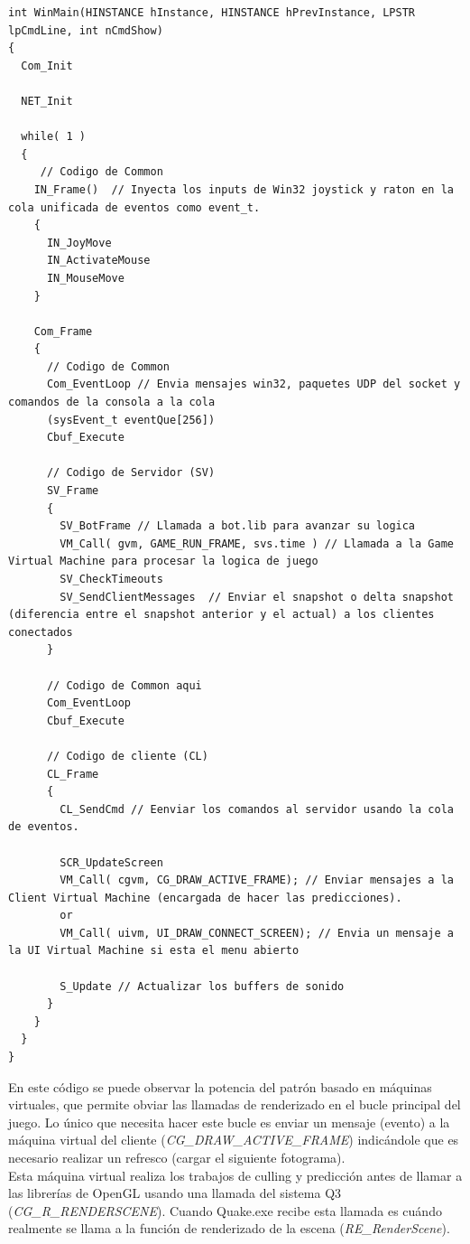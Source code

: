 \documentclass[a4paper,12pt]{report}
\begin{document}
	\begin{lstlisting}[style=C, numbers=none]
int WinMain(HINSTANCE hInstance, HINSTANCE hPrevInstance, LPSTR lpCmdLine, int nCmdShow)
{
  Com_Init
	
  NET_Init
	
  while( 1 )
  {
     // Codigo de Common 
    IN_Frame()  // Inyecta los inputs de Win32 joystick y raton en la cola unificada de eventos como event_t.
    {
      IN_JoyMove
      IN_ActivateMouse
      IN_MouseMove
    }
    
    Com_Frame
    {
      // Codigo de Common 
      Com_EventLoop // Envia mensajes win32, paquetes UDP del socket y comandos de la consola a la cola
      (sysEvent_t eventQue[256])
      Cbuf_Execute
      
      // Codigo de Servidor (SV)
      SV_Frame
      {
        SV_BotFrame // Llamada a bot.lib para avanzar su logica
        VM_Call( gvm, GAME_RUN_FRAME, svs.time ) // Llamada a la Game Virtual Machine para procesar la logica de juego
        SV_CheckTimeouts
        SV_SendClientMessages  // Enviar el snapshot o delta snapshot (diferencia entre el snapshot anterior y el actual) a los clientes conectados
      } 
      
      // Codigo de Common aqui
      Com_EventLoop
      Cbuf_Execute
      
      // Codigo de cliente (CL)
      CL_Frame
      {
        CL_SendCmd // Eenviar los comandos al servidor usando la cola de eventos.
        
        SCR_UpdateScreen
        VM_Call( cgvm, CG_DRAW_ACTIVE_FRAME); // Enviar mensajes a la Client Virtual Machine (encargada de hacer las predicciones).
        or
        VM_Call( uivm, UI_DRAW_CONNECT_SCREEN); // Envia un mensaje a la UI Virtual Machine si esta el menu abierto
        
        S_Update // Actualizar los buffers de sonido
      }
    }
  }
}
	\end{lstlisting}

    En este código se puede observar la potencia del patrón basado en máquinas virtuales, que permite obviar las llamadas de renderizado en el bucle principal del juego. Lo único que necesita hacer este bucle es enviar un mensaje (evento) a la máquina virtual del cliente (\textit{CG\_DRAW\_ACTIVE\_FRAME}) indicándole que es necesario realizar un refresco (cargar el siguiente fotograma).\\
    
    Esta máquina virtual realiza los trabajos de culling y predicción antes de llamar a las librerías de OpenGL usando una llamada del sistema Q3 (\textit{CG\_R\_RENDERSCENE}). Cuando Quake.exe recibe esta llamada es cuándo realmente se llama a la función de renderizado de la escena (\textit{RE\_RenderScene}).\cite{unrolled_loop_source}\cite{unrolled_loop}\\   
    
\end{document}
